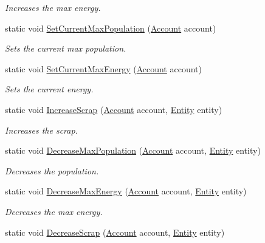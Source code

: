 \begin{DoxyCompactItemize}
\begin{DoxyCompactList}\small\item\em Increases the max energy. \end{DoxyCompactList}\item 
static void \hyperlink{classCore_1_1Models_1_1LogicRules_a2bf267a445128ca26bd61c8113fad7df}{Set\+Current\+Max\+Population} (\hyperlink{classCore_1_1Models_1_1Account}{Account} account)
\begin{DoxyCompactList}\small\item\em Sets the current max population. \end{DoxyCompactList}\item 
static void \hyperlink{classCore_1_1Models_1_1LogicRules_ac890759359d9ea01c51d423dbe504e89}{Set\+Current\+Max\+Energy} (\hyperlink{classCore_1_1Models_1_1Account}{Account} account)
\begin{DoxyCompactList}\small\item\em Sets the current energy. \end{DoxyCompactList}\item 
static void \hyperlink{classCore_1_1Models_1_1LogicRules_a012d1303c1d681129fd1df10b9ac194c}{Increase\+Scrap} (\hyperlink{classCore_1_1Models_1_1Account}{Account} account, \hyperlink{classCore_1_1Models_1_1Entity}{Entity} entity)
\begin{DoxyCompactList}\small\item\em Increases the scrap. \end{DoxyCompactList}\item 
static void \hyperlink{classCore_1_1Models_1_1LogicRules_affe9e8724caf3ef5b5d8c7e2d992d389}{Decrease\+Max\+Population} (\hyperlink{classCore_1_1Models_1_1Account}{Account} account, \hyperlink{classCore_1_1Models_1_1Entity}{Entity} entity)
\begin{DoxyCompactList}\small\item\em Decreases the population. \end{DoxyCompactList}\item 
static void \hyperlink{classCore_1_1Models_1_1LogicRules_a25f86390ccb398e269122da226220cef}{Decrease\+Max\+Energy} (\hyperlink{classCore_1_1Models_1_1Account}{Account} account, \hyperlink{classCore_1_1Models_1_1Entity}{Entity} entity)
\begin{DoxyCompactList}\small\item\em Decreases the max energy. \end{DoxyCompactList}\item 
static void \hyperlink{classCore_1_1Models_1_1LogicRules_a5ebbe4ae42aeef6b5774882e89a5ccb4}{Decrease\+Scrap} (\hyperlink{classCore_1_1Models_1_1Account}{Account} account, \hyperlink{classCore_1_1Models_1_1Entity}{Entity} entity)

\end{DoxyCompactItemize}
